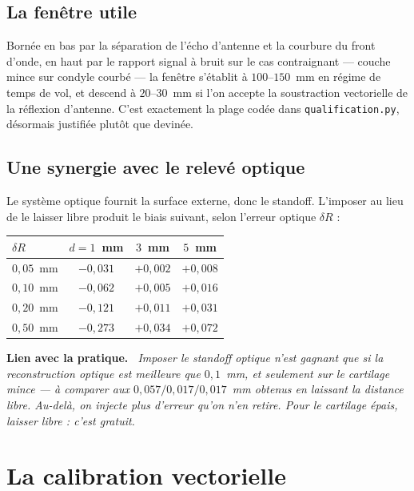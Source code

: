 \documentclass[11pt,a4paper]{article}
\newenvironment{implication}%
  {\par\medskip\begin{lrbox}{\implbox}\begin{minipage}{0.95\textwidth}%
   \textbf{Lien avec la pratique.}\itshape\ }%
  {\end{minipage}\end{lrbox}\noindent\fbox{\usebox{\implbox}}\par\medskip}
\begin{document}
\subsection{La fenêtre utile}

Bornée en bas par la séparation de l'écho d'antenne et la courbure du front
d'onde, en haut par le rapport signal à bruit sur le cas contraignant --- couche
mince sur condyle courbé --- la fenêtre s'établit à $100$--$150$~mm en régime de
temps de vol, et descend à $20$--$30$~mm si l'on accepte la soustraction
vectorielle de la réflexion d'antenne. C'est exactement la plage codée dans
\texttt{qualification.py}, désormais justifiée plutôt que devinée.

\subsection{Une synergie avec le relevé optique}

Le système optique fournit la surface externe, donc le standoff. L'imposer au
lieu de le laisser libre produit le biais suivant, selon l'erreur optique
$\delta R$ :

\begin{table}[h]
\centering
\begin{tabular}{lccc}
\toprule
$\delta R$ & $d = 1$~mm & $3$~mm & $5$~mm \\
\midrule
$0{,}05$~mm & $-0{,}031$ & $+0{,}002$ & $+0{,}008$ \\
$0{,}10$~mm & $-0{,}062$ & $+0{,}005$ & $+0{,}016$ \\
$0{,}20$~mm & $-0{,}121$ & $+0{,}011$ & $+0{,}031$ \\
$0{,}50$~mm & $-0{,}273$ & $+0{,}034$ & $+0{,}072$ \\
\bottomrule
\end{tabular}
\end{table}

\begin{implication}
Imposer le standoff optique n'est gagnant que si la reconstruction optique est
meilleure que $0{,}1$~mm, et seulement sur le cartilage mince --- à comparer aux
$0{,}057 / 0{,}017 / 0{,}017$~mm obtenus en laissant la distance libre. Au-delà,
on injecte plus d'erreur qu'on n'en retire. Pour le cartilage épais, laisser
libre : c'est gratuit.
\end{implication}

\section{La calibration vectorielle}
\label{sec:cal}
\end{document}
